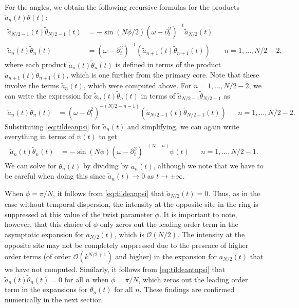 \documentclass[11pt,reqno]{amsart}
\begin{document}
For the angles, we obtain the following recursive formulas for the products $\tilde{a}_n(t)\tilde{\theta}(t)$:
\begin{equation}\label{eq:tildeantn}
\begin{aligned}
\tilde{a}_{N/2-1}(t) \tilde{\theta}_{N/2-1}(t) &= -\sin(N \phi/2) (\omega - \partial_t^2)^{-1} \tilde{a}_{N/2}(t) \\
\tilde{a}_n(t) \tilde{\theta}_n(t) &= (\omega - \partial_t^2)^{-1} \left( \tilde{a}_{n+1}(t) \tilde{\theta}_{n+1}(t) \right) && n = 1, \dots, N/2-2,
\end{aligned}
\end{equation}
where each product $\tilde{a}_n(t) \tilde{\theta}_n(t)$ is defined in terms of the product $\tilde{a}_{n+1}(t) \tilde{\theta}_{n+1}(t)$, which is one further from the primary core. Note that these involve the terms $\tilde{a}_n(t)$, which were computed above. For $n = 1, \dots, N/2-2$, we can write the expression for $\tilde{a}_n(t) \tilde{\theta}_n(t)$ in terms of $\tilde{a}_{N/2-1} \tilde{\theta}_{N/2-1}$ as
\begin{align*}
\tilde{a}_n(t) \tilde{\theta}_n(t) &= (\omega - \partial_t^2)^{-(N/2-n-1)} \left( \tilde{a}_{N/2-1}(t) \tilde{\theta}_{N/2-1}(t) \right) && n = 1, \dots, N/2-2.
\end{align*}
Substituting \cref{eq:tildeanpsi} for $\tilde{a}_n(t)$ and simplifying, we can again write everything in terms of $\psi(t)$ to get
\begin{equation}\label{eq:tildeantnpsi}
\begin{aligned}
\tilde{a}_n(t) \tilde{\theta}_n(t) &= -\sin(N \phi) (\omega - \partial_t^2)^{-(N-n)} \psi(t) && n = 1, \dots, N/2-1.
\end{aligned}
\end{equation}
We can solve for $\tilde{\theta}_n(t)$ by dividing by $\tilde{a}_n(t)$, although we note that we have to be careful when doing this since $\tilde{a}_n(t) \rightarrow 0$ as $t \rightarrow \pm \infty$.

When $\phi = \pi/N$, it follows from \cref{eq:tildeanpsi} that $\tilde{a}_{N/2}(t) = 0$. Thus, as in the case without temporal dispersion, the intensity at the opposite site in the ring is suppressed at this value of the twist parameter $\phi$. It is important to note, however, that this choice of $\phi$ only zeros out the leading order term in the asymptotic expansion for $a_{N/2}(t)$, which is $\mathcal{O}(N/2)$. The intensity at the opposite site may not be completely suppressed due to the presence of higher order terms (of order $\mathcal{O}(k^{N/2+1})$ and higher) in the expansion for $a_{N/2}(t)$ that we have not computed. Similarly, it follows from \cref{eq:tildeantnpsi} that $\tilde{a}_n(t) \tilde{\theta}_n(t) = 0$ for all $n$ when $\phi = \pi/N$, which zeros out the leading order term in the expansions for $\theta_n(t)$ for all $n$. These findings are confirmed numerically in the next section.
\end{document}
